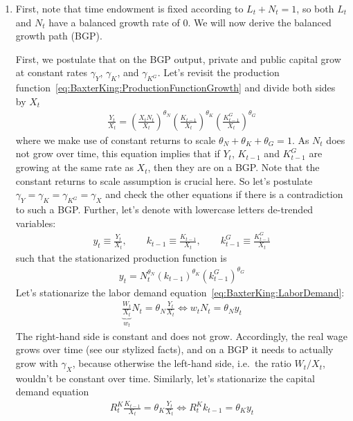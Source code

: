 \begin{enumerate}
\begin{enumerate}
\item
First, note that time endowment is fixed according to \(L_t+N_t=1\),
  so both \(L_t\) and \(N_t\) have a balanced growth rate of 0.
We will now derive the balanced growth path ({BGP}).

First, we postulate that on the {BGP} output, private and public capital
  grow at constant rates \(\gamma_Y\), \(\gamma_K\), and \(\gamma_{K^G}\).
Let's revisit the production function~\eqref{eq:BaxterKing:ProductionFunctionGrowth} and divide both sides by \(X_t\)
\begin{align*}
\frac{Y_t}{X_t} = {\left(\frac{X_t N_t}{X_t}\right)}^{\theta_N} {\left(\frac{K_{t-1}}{X_t}\right)}^{\theta_K} {\left(\frac{K^G_{t-1}}{X_t}\right)}^{\theta_G}
\end{align*}
where we make use of constant returns to scale \(\theta_N+\theta_K+\theta_G=1\).
As \(N_t\) does not grow over time, this equation implies that
  if \(Y_t\), \(K_{t-1}\) and \(K_{t-1}^G\) are growing at the same rate as \(X_t\),
  then they are on a {BGP}.
Note that the constant returns to scale assumption is crucial here.
So let's postulate \(\gamma_Y=\gamma_K=\gamma_{K^G}=\gamma_X\)
  and check the other equations if there is a contradiction to such a {BGP}. 
Further, let's denote with lowercase letters de-trended variables:
\begin{align*}
y_t \equiv \frac{Y_t}{X_t}, \qquad k_{t-1} \equiv \frac{K_{t-1}}{X_t}, \qquad k^G_{t-1} \equiv \frac{K^G_{t-1}}{X_t}
\end{align*}
such that the stationarized production function is
\begin{align*}
y_t = N_t^{\theta_N} {(k_{t-1})}^{\theta_K} {(k^G_{t-1})}^{\theta_G}
\end{align*}
Let's stationarize the labor demand equation~\eqref{eq:BaxterKing:LaborDemand}:
\begin{align*}
\underbrace{\frac{W_t}{X_t}}_{w_t} N_t = \theta_N \frac{Y_t}{X_t} \Leftrightarrow w_t N_t = \theta_N y_t
\end{align*}
The right-hand side is constant and does not grow.
Accordingly, the real wage grows over time (see our stylized facts),
  and on a {BGP} it needs to actually grow with \(\gamma_X\),
  because otherwise the left-hand side, i.e.\
  the ratio \(W_t/X_t\), wouldn't be constant over time.
Similarly, let's stationarize the capital demand equation
\begin{align*}
R^K_t \frac{K_{t-1}}{X_t} = \theta_K \frac{Y_t}{X_t} \Leftrightarrow R^K_t k_{t-1} = \theta_K y_t
\end{align*}    

\end{enumerate}
\end{enumerate}
